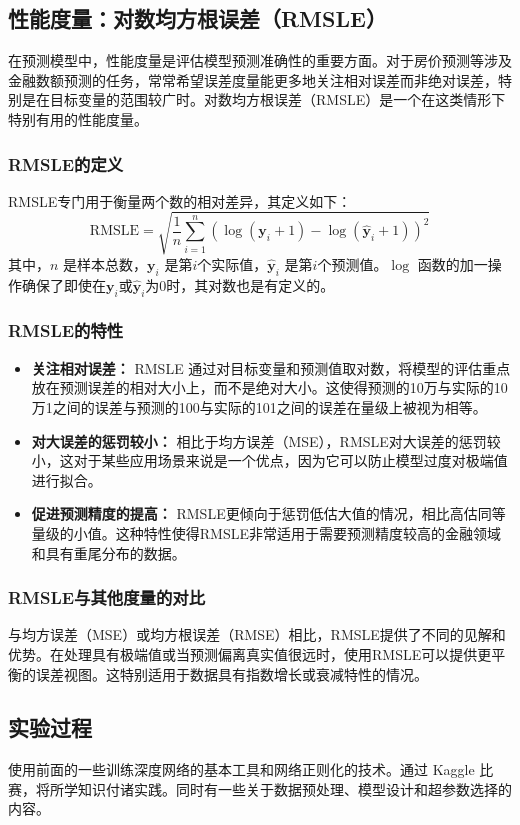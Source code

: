 \documentclass[a4paper,12pt]{article}
\begin{document}
\subsection{性能度量：对数均方根误差（RMSLE）}
在预测模型中，性能度量是评估模型预测准确性的重要方面。对于房价预测等涉及金融数额预测的任务，常常希望误差度量能更多地关注相对误差而非绝对误差，特别是在目标变量的范围较广时。对数均方根误差（RMSLE）是一个在这类情形下特别有用的性能度量。

\subsubsection{RMSLE的定义}
RMSLE专门用于衡量两个数的相对差异，其定义如下：
\[
\text{RMSLE} = \sqrt{\frac{1}{n} \sum_{i=1}^n (\log(\mathbf{y}_i + 1) - \log(\hat{\mathbf{y}}_i + 1))^2}
\]
其中，$n$ 是样本总数，$\mathbf{y}_i$ 是第$i$个实际值，$\hat{\mathbf{y}}_i$ 是第$i$个预测值。$\log$ 函数的加一操作确保了即使在$\mathbf{y}_i$或$\hat{\mathbf{y}}_i$为0时，其对数也是有定义的。

\subsubsection{RMSLE的特性}
\begin{itemize}
	\item \textbf{关注相对误差：} RMSLE 通过对目标变量和预测值取对数，将模型的评估重点放在预测误差的相对大小上，而不是绝对大小。这使得预测的10万与实际的10万1之间的误差与预测的100与实际的101之间的误差在量级上被视为相等。
	
	\item \textbf{对大误差的惩罚较小：} 相比于均方误差（MSE），RMSLE对大误差的惩罚较小，这对于某些应用场景来说是一个优点，因为它可以防止模型过度对极端值进行拟合。
	
	\item \textbf{促进预测精度的提高：} RMSLE更倾向于惩罚低估大值的情况，相比高估同等量级的小值。这种特性使得RMSLE非常适用于需要预测精度较高的金融领域和具有重尾分布的数据。
\end{itemize}

\subsubsection{RMSLE与其他度量的对比}
与均方误差（MSE）或均方根误差（RMSE）相比，RMSLE提供了不同的见解和优势。在处理具有极端值或当预测偏离真实值很远时，使用RMSLE可以提供更平衡的误差视图。这特别适用于数据具有指数增长或衰减特性的情况。

\subsection{实验过程}
使用前面的一些训练深度网络的基本工具和网络正则化的技术。通过 Kaggle 比赛，将所学知识付诸实践。同时有一些关于数据预处理、模型设计和超参数选择的内容。
\end{document}
